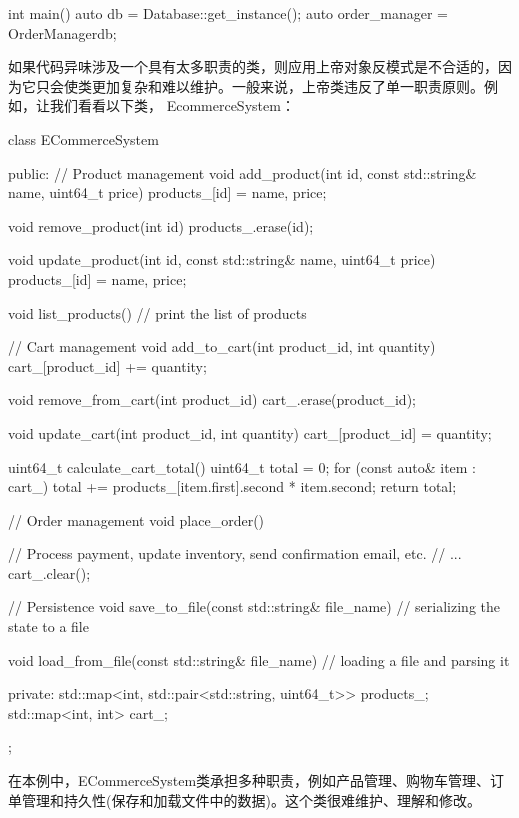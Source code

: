 \begin{cpp}
int main() {
    auto db = Database::get_instance();
    auto order_manager = OrderManager{db};
}
\end{cpp}

如果代码异味涉及一个具有太多职责的类，则应用上帝对象反模式是不合适的，因为它只会使类更加复杂和难以维护。一般来说，上帝类违反了单一职责原则。例如，让我们看看以下类， EcommerceSystem：

\begin{cpp}
class ECommerceSystem {
public:
    // Product management
    void add_product(int id, const std::string& name, uint64_t price)
    {
        products_[id] = {name, price};
    }

    void remove_product(int id) {
        products_.erase(id);
    }

    void update_product(int id, const std::string& name, uint64_t
    price) {
        products_[id] = {name, price};
    }

    void list_products() {
        // print the list of products
    }

    // Cart management
    void add_to_cart(int product_id, int quantity) {
        cart_[product_id] += quantity;
    }

    void remove_from_cart(int product_id) {
        cart_.erase(product_id);
    }

    void update_cart(int product_id, int quantity) {
        cart_[product_id] = quantity;
    }

    uint64_t calculate_cart_total() {
        uint64_t total = 0;
        for (const auto& item : cart_) {
            total += products_[item.first].second * item.second;
        }
        return total;
    }

    // Order management
    void place_order() {

        // Process payment, update inventory, send confirmation email,
        etc.
        // ...
        cart_.clear();
    }

    // Persistence
    void save_to_file(const std::string& file_name) {
        // serializing the state to a file
    }

    void load_from_file(const std::string& file_name) {
        // loading a file and parsing it
    }

private:
    std::map<int, std::pair<std::string, uint64_t>> products_;
    std::map<int, int> cart_;
};
\end{cpp}

在本例中，ECommerceSystem类承担多种职责，例如产品管理、购物车管理、订单管理和持久性(保存和加载文件中的数据)。这个类很难维护、理解和修改。

